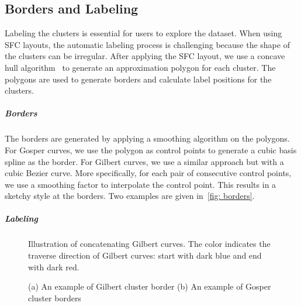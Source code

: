 \subsection{Borders and Labeling}
Labeling the clusters is essential for users to explore the dataset.
When using SFC layouts, the automatic labeling process is challenging because the shape of the clusters can be irregular.
After applying the SFC layout, we use a concave hull algorithm~\cite{park2012concavehull} to generate an approximation polygon for each cluster.
The polygons are used to generate borders and calculate label positions for the clusters.
\subparagraph{Borders} 
The borders are generated by applying a smoothing algorithm on the polygons.
For Gosper curves, we use the polygon as control points to generate a cubic basis spline as the border.
For Gilbert curves, we use a similar approach but with a cubic Bezier curve.
More specifically, for each pair of consecutive control points, we use a smoothing factor to interpolate the control point.
This results in a sketchy style at the borders.
Two examples are given in~\autoref{fig: borders}.
\subparagraph{Labeling}
\begin{figure}%
    \centering
    \qquad
    \caption{
        Illustration of concatenating Gilbert curves. 
        The color indicates the traverse direction of Gilbert curves: start with dark blue and end with dark red.
    }%
    \label{fig: gilbert}%
\end{figure}
\begin{figure}%
    \centering
    \qquad
    \caption{(a) An example of Gilbert cluster border (b) An example of Gosper cluster borders}%
    \label{fig: borders}%
\end{figure}



